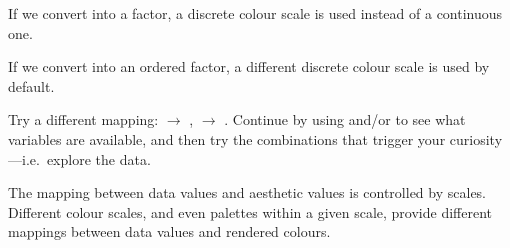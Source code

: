 \documentclass[krantz2]{krantz}\usepackage{knitr}%
\begin{document}
If we convert  into a factor, a discrete colour scale is used instead of a continuous one.

\begin{knitrout}\footnotesize
{}\color{fgcolor}\begin{kframe}
\begin{alltt}
\hlstd{(} 
       \hlstd{(}     \hlstd{=}  \hlopt{+}
  \hlstd{()}
\end{alltt}
\end{kframe}
\end{knitrout}

If we convert  into an ordered factor, a different discrete colour scale is used by default.

\begin{knitrout}\footnotesize
{}\color{fgcolor}\begin{kframe}
\begin{alltt}
\hlstd{(} 
       \hlstd{(}     \hlstd{=}  \hlopt{+}
  \hlstd{()}
\end{alltt}
\end{kframe}
\end{knitrout}

\begin{playground}
Try a different mapping:  $\rightarrow$ ,  $\rightarrow$ . Continue by using  and/or  to see what variables are available, and then try the combinations that trigger your curiosity---i.e.\ explore the data.
\end{playground}

The mapping between data values and aesthetic values is controlled by scales. Different colour scales, and even palettes within a given scale, provide different mappings between data values and rendered colours.

\begin{knitrout}\footnotesize
{}\color{fgcolor}\begin{kframe}
\begin{alltt}
\hlstd{(} 
       \hlstd{(}     \hlstd{=}  \hlopt{+}
  \hlstd{()} \hlopt{+}
  \hlstd{(} \hlstd{=} \hlstd{,}  \hlstd{=} \hlstd{)}
\end{alltt}
\end{kframe}
\end{knitrout}
\end{document}
